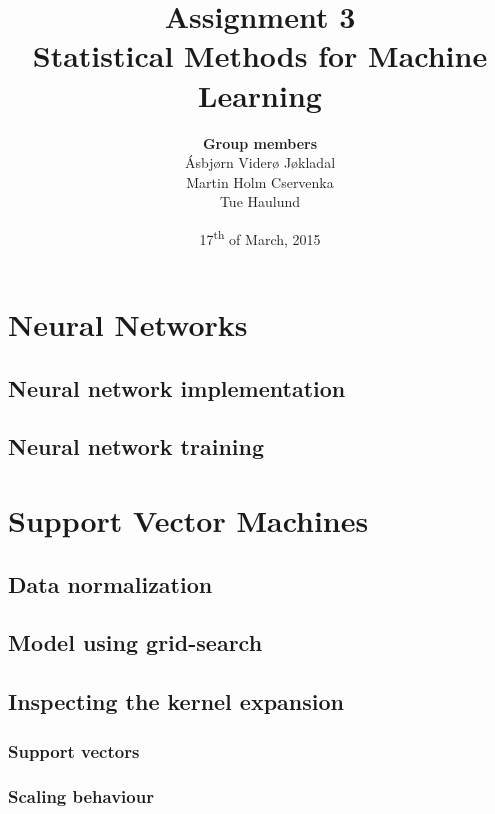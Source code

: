 \documentclass[a4paper]{article}
\title{\textbf{Assignment 3} \\ \small Statistical Methods for Machine Learning }
\author{\textbf{Group members}\\
        Ásbjørn Viderø Jøkladal\\
        Martin Holm Cservenka\\
        Tue Haulund}
\date{17\textsuperscript{th} of March, 2015}
\begin{document}
\maketitle
\tableofcontents
\newpage

\section{Neural Networks}

\subsection{Neural network implementation}

\subsection{Neural network training}

\section{Support Vector Machines}

\subsection{Data normalization}

\subsection{Model using grid-search}

\subsection{Inspecting the kernel expansion}

\subsubsection{Support vectors}

\subsubsection{Scaling behaviour}
\end{document}
